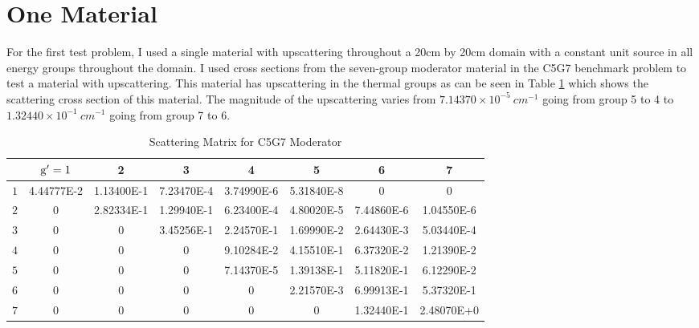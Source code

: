 \section{One Material}
For the first test problem, I used a single material with upscattering throughout a 20cm by 20cm domain with a constant unit source in all energy groups throughout the domain. 
 I used cross sections from the seven-group moderator material in the C5G7 benchmark problem \cite{C5G7} to test a material with upscattering.  This material has upscattering in the thermal groups as can be seen in Table \ref{table:modxs} which shows the scattering cross section of this material. The magnitude of the upscattering varies from $7.14370 \times 10^{-5} \: cm^{-1}$ going from group 5 to 4 to $1.32440 \times 10^{-1} \: cm^{-1}$ going from group 7 to 6. 
 \begin{table}[!htb]
\footnotesize
\centering
\caption{Scattering Matrix for C5G7 Moderator}
\begin{center}
    \begin{tabular}{|c|c|c|c|c|c|c|c|}
\hline
 & $\mathrm{g}'=1$ & 2 & 3 & 4 & 5 & 6 & 7 \\ 
\hline
 $1$ & 4.44777E-2 &  1.13400E-1 & 7.23470E-4 & 3.74990E-6 & 5.31840E-8     &  0     &    0  \\
\hline
 $2$  & 0       &    2.82334E-1 & 1.29940E-1 & 6.23400E-4  & 4.80020E-5  & 7.44860E-6 &  1.04550E-6 \\
\hline
 $3$  & 0        &      0  &     3.45256E-1 & 2.24570E-1 & 1.69990E-2 & 2.64430E-3 & 5.03440E-4 \\
\hline
 $4$  & 0          &     0    &       0     &  9.10284E-2 & 4.15510E-1 & 6.37320E-2 & 1.21390E-2 \\
\hline
 $5$  & 0        &       0     &      0     & 7.14370E-5 & 1.39138E-1 & 5.11820E-1 & 6.12290E-2 \\
\hline
$6$  & 0        &       0   &    0      &  0     &  2.21570E-3 & 6.99913E-1 &  5.37320E-1 \\
\hline
$7$  & 0       &        0        &   0      &     0      &     0   &    1.32440E-1 & 2.48070E+0 \\
\hline
    \end{tabular}
\end{center}
\label{table:modxs}
\end{table}

